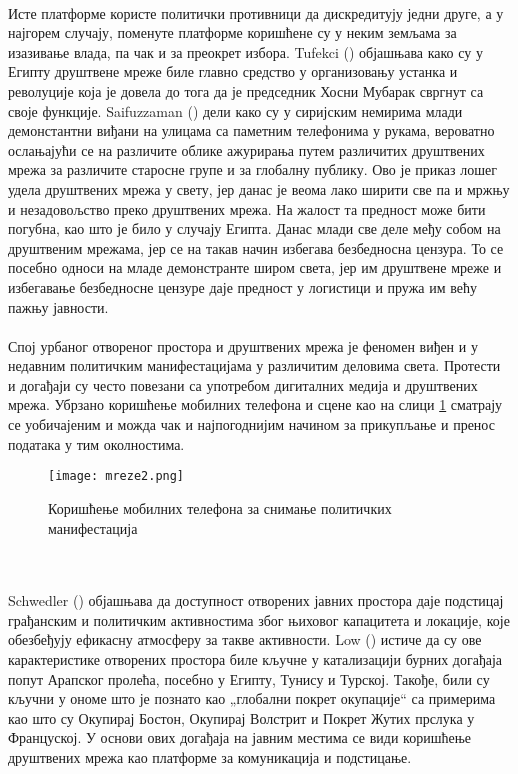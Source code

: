 \documentclass{article}
\begin{document}
\\
Исте платформе користе политички противници да дискредитују једни друге, а у најгорем случају, поменуте платформе коришћене су у неким земљама за изазивање влада, па чак и за преокрет избора. Tufekci (\cite{tu_2014}) објашњава како су у Египту друштвене мреже биле главно средство у организовању устанка и револуције која је довела до тога да је председник Хосни Мубарак свргнут са своје функције. Saifuzzaman (\cite{s_2017}) дели како су у сиријским немирима млади демонстантни виђани на улицама са паметним телефонима у рукама, вероватно ослањајући се на различите облике ажурирања путем различитих друштвених мрежа за различите старосне групе и за глобалну публику. Ово је приказ лошег удела друштвених мрежа у свету, јер данас је веома лако ширити све па и мржњу и незадовољство преко друштвених мрежа. На жалост та предност може бити погубна, као што је било у случају Египта. Данас млади све деле међу собом на друштвеним мрежама, јер се на такав начин избегава безбедносна цензура. То се посебно односи на младе демонстранте широм света, јер им друштвене мреже и избегавање безбедносне цензуре даје предност у логистици и пружа им већу пажњу јавности.
\\\\
Спој урбаног отвореног простора и друштвених мрежа је феномен виђен и у недавним политичким манифестацијама у различитим деловима света. Протести и догађаји су често повезани са употребом дигиталних медија и друштвених мрежа. Убрзано коришћење мобилних телефона и сцене као на слици \ref{fig:mreze2} сматрају се уобичајеним и можда чак и најпогоднијим начином за прикупљање и пренос података у тим околностима.\\
\begin{figure}[h!]
\centering
\texttt{[image: mreze2.png]}
\caption{\label{fig:mreze2}Коришћење мобилних телефона за снимање политичких манифестација}
\end{figure}
\\\\
Schwedler (\cite{s_2013}) објашњава да доступност отворених јавних простора даје подстицај грађанским и политичким активностима због њиховог капацитета и локације, које обезбеђују ефикасну атмосферу за такве активности. Low (\cite{l_2017}) истиче да су ове карактеристике отворених простора биле кључне у катализацији бурних догађаја попут Арапског пролећа, посебно у Египту, Тунису и Турској. Такође, били су кључни у ономе што је познато као „глобални покрет окупације“ са примерима као што су Окупирај Бостон, Окупирај Волстрит и Покрет Жутих прслука у Француској. У основи ових догађаја на јавним местима се види коришћење друштвених мрежа као платформе за комуникација и подстицање. \\\\
\end{document}
